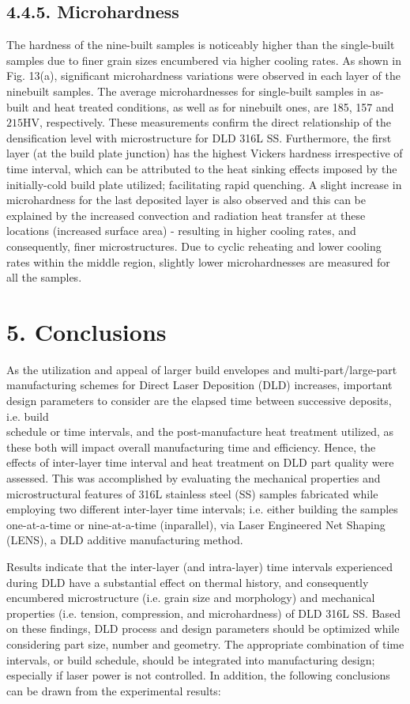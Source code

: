 \documentclass[10pt]{article}
\begin{document}
\subsection*{4.4.5. Microhardness}
The hardness of the nine-built samples is noticeably higher than the single-built samples due to finer grain sizes encumbered via higher cooling rates. As shown in Fig. 13(a), significant microhardness variations were observed in each layer of the ninebuilt samples. The average microhardnesses for single-built samples in as-built and heat treated conditions, as well as for ninebuilt ones, are 185, 157 and $215 \mathrm{HV}$, respectively. These measurements confirm the direct relationship of the densification level with microstructure for DLD 316L SS. Furthermore, the first layer (at the build plate junction) has the highest Vickers hardness irrespective of time interval, which can be attributed to the heat sinking effects imposed by the initially-cold build plate utilized; facilitating rapid quenching. A slight increase in microhardness for the last deposited layer is also observed and this can be explained by the increased convection and radiation heat transfer at these locations (increased surface area) - resulting in higher cooling rates, and consequently, finer microstructures. Due to cyclic reheating and lower cooling rates within the middle region, slightly lower microhardnesses are measured for all the samples.

\section*{5. Conclusions}
As the utilization and appeal of larger build envelopes and multi-part/large-part manufacturing schemes for Direct Laser Deposition (DLD) increases, important design parameters to consider are the elapsed time between successive deposits, i.e. build\\
schedule or time intervals, and the post-manufacture heat treatment utilized, as these both will impact overall manufacturing time and efficiency. Hence, the effects of inter-layer time interval and heat treatment on DLD part quality were assessed. This was accomplished by evaluating the mechanical properties and microstructural features of 316L stainless steel (SS) samples fabricated while employing two different inter-layer time intervals; i.e. either building the samples one-at-a-time or nine-at-a-time (inparallel), via Laser Engineered Net Shaping (LENS), a DLD additive manufacturing method.

Results indicate that the inter-layer (and intra-layer) time intervals experienced during DLD have a substantial effect on thermal history, and consequently encumbered microstructure (i.e. grain size and morphology) and mechanical properties (i.e. tension, compression, and microhardness) of DLD 316L SS. Based on these findings, DLD process and design parameters should be optimized while considering part size, number and geometry. The appropriate combination of time intervals, or build schedule, should be integrated into manufacturing design; especially if laser power is not controlled. In addition, the following conclusions can be drawn from the experimental results:
\end{document}
